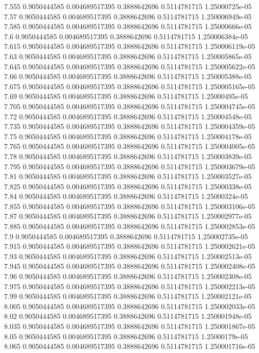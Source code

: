 {7.555 0.9050444585 0.004689517395 0.3888642696 0.5114781715 1.25000725e-05
7.57 0.9050444585 0.004689517395 0.3888642696 0.5114781715 1.250006949e-05
7.585 0.9050444585 0.004689517395 0.3888642696 0.5114781715 1.25000666e-05
7.6 0.9050444585 0.004689517395 0.3888642696 0.5114781715 1.250006384e-05
7.615 0.9050444585 0.004689517395 0.3888642696 0.5114781715 1.250006119e-05
7.63 0.9050444585 0.004689517395 0.3888642696 0.5114781715 1.250005865e-05
7.645 0.9050444585 0.004689517395 0.3888642696 0.5114781715 1.250005622e-05
7.66 0.9050444585 0.004689517395 0.3888642696 0.5114781715 1.250005388e-05
7.675 0.9050444585 0.004689517395 0.3888642696 0.5114781715 1.250005165e-05
7.69 0.9050444585 0.004689517395 0.3888642696 0.5114781715 1.25000495e-05
7.705 0.9050444585 0.004689517395 0.3888642696 0.5114781715 1.250004745e-05
7.72 0.9050444585 0.004689517395 0.3888642696 0.5114781715 1.250004548e-05
7.735 0.9050444585 0.004689517395 0.3888642696 0.5114781715 1.250004359e-05
7.75 0.9050444585 0.004689517395 0.3888642696 0.5114781715 1.250004178e-05
7.765 0.9050444585 0.004689517395 0.3888642696 0.5114781715 1.250004005e-05
7.78 0.9050444585 0.004689517395 0.3888642696 0.5114781715 1.250003839e-05
7.795 0.9050444585 0.004689517395 0.3888642696 0.5114781715 1.250003679e-05
7.81 0.9050444585 0.004689517395 0.3888642696 0.5114781715 1.250003527e-05
7.825 0.9050444585 0.004689517395 0.3888642696 0.5114781715 1.25000338e-05
7.84 0.9050444585 0.004689517395 0.3888642696 0.5114781715 1.25000324e-05
7.855 0.9050444585 0.004689517395 0.3888642696 0.5114781715 1.250003106e-05
7.87 0.9050444585 0.004689517395 0.3888642696 0.5114781715 1.250002977e-05
7.885 0.9050444585 0.004689517395 0.3888642696 0.5114781715 1.250002853e-05
7.9 0.9050444585 0.004689517395 0.3888642696 0.5114781715 1.250002735e-05
7.915 0.9050444585 0.004689517395 0.3888642696 0.5114781715 1.250002621e-05
7.93 0.9050444585 0.004689517395 0.3888642696 0.5114781715 1.250002513e-05
7.945 0.9050444585 0.004689517395 0.3888642696 0.5114781715 1.250002408e-05
7.96 0.9050444585 0.004689517395 0.3888642696 0.5114781715 1.250002308e-05
7.975 0.9050444585 0.004689517395 0.3888642696 0.5114781715 1.250002213e-05
7.99 0.9050444585 0.004689517395 0.3888642696 0.5114781715 1.250002121e-05
8.005 0.9050444585 0.004689517395 0.3888642696 0.5114781715 1.250002033e-05
8.02 0.9050444585 0.004689517395 0.3888642696 0.5114781715 1.250001948e-05
8.035 0.9050444585 0.004689517395 0.3888642696 0.5114781715 1.250001867e-05
8.05 0.9050444585 0.004689517395 0.3888642696 0.5114781715 1.25000179e-05
8.065 0.9050444585 0.004689517395 0.3888642696 0.5114781715 1.250001716e-05
}
